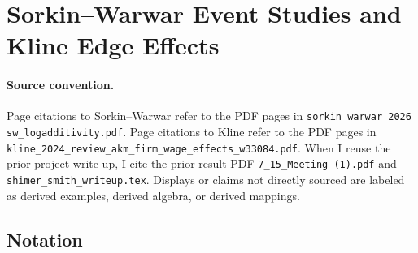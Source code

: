 ﻿\documentclass[11pt]{article}
\newcommand{\1}{\mathbf{1}}
\begin{document}
\section{Sorkin--Warwar Event Studies and Kline Edge Effects}

\paragraph{Source convention.}

Page citations to Sorkin--Warwar refer to the PDF pages in
\texttt{sorkin warwar 2026 sw\_logadditivity.pdf}. Page citations to Kline refer
to the PDF pages in \texttt{kline\_2024\_review\_akm\_firm\_wage\_effects\_w33084.pdf}.
When I reuse the prior project write-up, I cite the prior result PDF
\texttt{7\_15\_Meeting (1).pdf} and \texttt{shimer\_smith\_writeup.tex}.
Displays or claims not directly sourced are labeled as derived examples,
derived algebra, or derived mappings.

\subsection{Notation}
\end{document}
